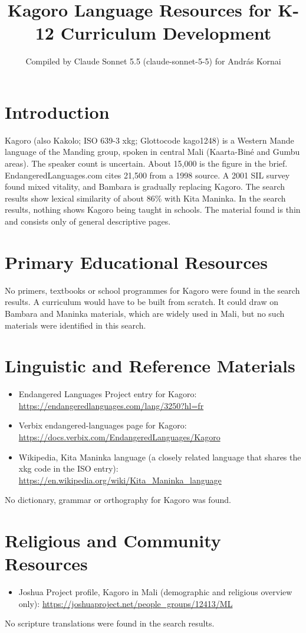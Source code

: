 \documentclass[12pt]{article}
\title{Kagoro Language Resources for K-12 Curriculum Development}
\author{Compiled by Claude Sonnet 5.5 (claude-sonnet-5-5) for Andr\'as Kornai}
\date{}
\begin{document}
\maketitle

\section{Introduction}
Kagoro (also Kakolo; ISO 639-3 xkg; Glottocode kago1248) is a Western Mande language of the Manding group, spoken in central Mali (Kaarta-Bin\'e and Gumbu areas). The speaker count is uncertain. About 15,000 is the figure in the brief. EndangeredLanguages.com cites 21,500 from a 1998 source. A 2001 SIL survey found mixed vitality, and Bambara is gradually replacing Kagoro. The search results show lexical similarity of about 86\% with Kita Maninka. In the search results, nothing shows Kagoro being taught in schools. The material found is thin and consists only of general descriptive pages.

\section{Primary Educational Resources}
No primers, textbooks or school programmes for Kagoro were found in the search results. A curriculum would have to be built from scratch. It could draw on Bambara and Maninka materials, which are widely used in Mali, but no such materials were identified in this search.

\section{Linguistic and Reference Materials}
\begin{itemize}
\item Endangered Languages Project entry for Kagoro: \url{https://endangeredlanguages.com/lang/3250?hl=fr}
\item Verbix endangered-languages page for Kagoro: \url{https://docs.verbix.com/EndangeredLanguages/Kagoro}
\item Wikipedia, Kita Maninka language (a closely related language that shares the xkg code in the ISO entry): \url{https://en.wikipedia.org/wiki/Kita_Maninka_language}
\end{itemize}
No dictionary, grammar or orthography for Kagoro was found.

\section{Religious and Community Resources}
\begin{itemize}
\item Joshua Project profile, Kagoro in Mali (demographic and religious overview only): \url{https://joshuaproject.net/people_groups/12413/ML}
\end{itemize}
No scripture translations were found in the search results.
\end{document}
